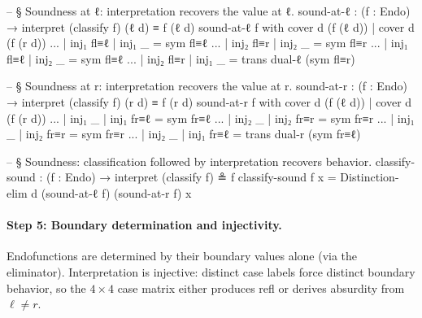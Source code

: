\documentclass[11pt,a4paper]{book}
\def\texttt#1{#1}%
\begin{document}
\begin{code}
  -- § Soundness at ℓ: interpretation recovers the value at ℓ.
  sound-at-ℓ : (f : Endo) → interpret (classify f) (ℓ d) ≡ f (ℓ d)
  sound-at-ℓ f with cover d (f (ℓ d)) | cover d (f (r d))
  ... | inj₁ fl≡ℓ | inj₁ _     = sym fl≡ℓ
  ... | inj₂ fl≡r | inj₂ _     = sym fl≡r
  ... | inj₁ fl≡ℓ | inj₂ _     = sym fl≡ℓ
  ... | inj₂ fl≡r | inj₁ _     = trans dual-ℓ (sym fl≡r)

  -- § Soundness at r: interpretation recovers the value at r.
  sound-at-r : (f : Endo) → interpret (classify f) (r d) ≡ f (r d)
  sound-at-r f with cover d (f (ℓ d)) | cover d (f (r d))
  ... | inj₁ _     | inj₁ fr≡ℓ = sym fr≡ℓ
  ... | inj₂ _     | inj₂ fr≡r = sym fr≡r
  ... | inj₁ _     | inj₂ fr≡r = sym fr≡r
  ... | inj₂ _     | inj₁ fr≡ℓ = trans dual-r (sym fr≡ℓ)

  -- § Soundness: classification followed by interpretation recovers behavior.
  classify-sound : (f : Endo) → interpret (classify f) ≗ f
  classify-sound f x = Distinction-elim d (sound-at-ℓ f) (sound-at-r f) x
\end{code}

\paragraph{Step 5: Boundary determination and injectivity.}
Endofunctions are determined by their boundary values alone (via the eliminator).
Interpretation is injective: distinct case labels force distinct boundary behavior, so the $4 \times 4$ case matrix either produces \texttt{refl} or derives absurdity from $\ell \neq r$.
\end{document}
